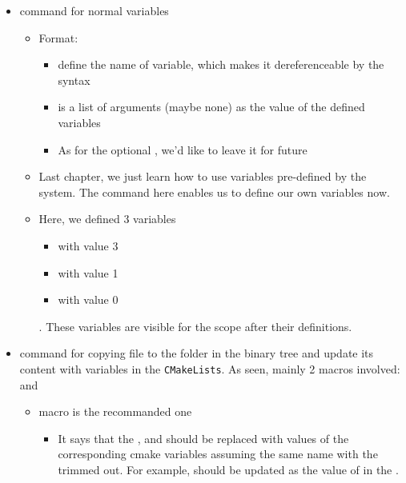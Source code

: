 \begin{itemize}  
  \item {} command for normal variables
    \begin{itemize}  
      \item Format: 
        \begin{itemize}  
          \item {} define the name of variable, which makes it dereferenceable by the  syntax
          \item {} is a list of arguments (maybe none) as the value of the defined variables
          \item As for the optional , we'd like to leave it for future 
        \end{itemize}  
      \item Last chapter, we just learn how to use variables pre-defined by the  system. The  command here enables us to define our own variables now. 
      \item Here, we defined 3 variables
        \begin{itemize}  
          \item {} with value 3 
          \item {} with value 1 
          \item {} with value 0
        \end{itemize}  
. These variables are visible for the scope after their definitions. 
    \end{itemize}  
  \item {} command for copying file  to the  folder in the binary tree and update its content with variables in the \texttt{CMakeLists}. As seen, mainly 2 macros involved:  and 
    \begin{itemize}  
      \item macro  is the recommanded one
        \begin{itemize}  
          \item It says that the ,  and  should be replaced with values of the corresponding cmake variables assuming the same name with the  trimmed out. For example,  should be updated as the value of  in the .

\end{itemize}
\end{itemize}
\end{itemize}
